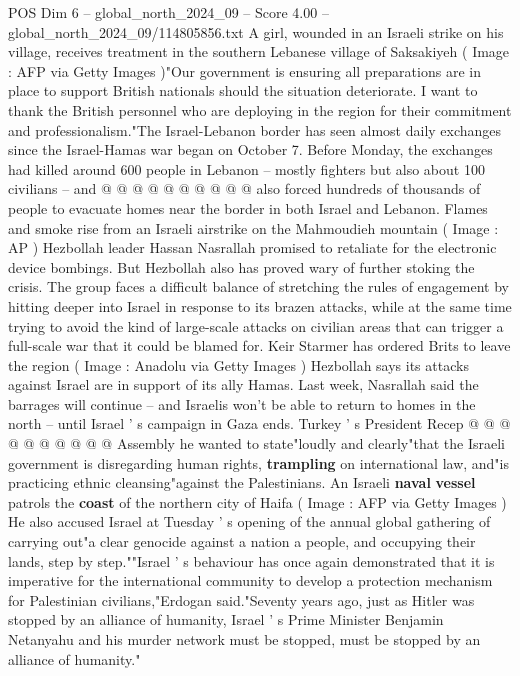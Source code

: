 \begin{textsample}{POS Dim 6 – global\_north\_2024\_09 – Score 4.00 – global\_north\_2024\_09/114805856.txt}
A girl, wounded in an Israeli strike on his village, receives treatment in the southern Lebanese village of Saksakiyeh ( Image : AFP via Getty Images )"Our government is ensuring all preparations are in place to support British nationals should the situation deteriorate.
I want to thank the British personnel who are deploying in the region for their commitment and professionalism."The Israel-Lebanon border has seen almost daily exchanges since the Israel-Hamas war began on October 7.
Before Monday, the exchanges had killed around 600 people in Lebanon -- mostly fighters but also about 100 civilians -- and @ @ @ @ @ @ @ @ @ @ also forced hundreds of thousands of people to evacuate homes near the border in both Israel and Lebanon.
Flames and smoke rise from an Israeli airstrike on the Mahmoudieh mountain ( Image : AP ) Hezbollah leader Hassan Nasrallah promised to retaliate for the electronic device bombings.
But Hezbollah also has proved wary of further stoking the crisis.
The group faces a difficult balance of stretching the rules of engagement by hitting deeper into Israel in response to its brazen attacks, while at the same time trying to avoid the kind of large-scale attacks on civilian areas that can trigger a full-scale war that it could be blamed for.
Keir Starmer has ordered Brits to leave the region ( Image : Anadolu via Getty Images ) Hezbollah says its attacks against Israel are in support of its ally Hamas.
Last week, Nasrallah said the barrages will continue -- and Israelis won't be able to return to homes in the north -- until Israel ' s campaign in Gaza ends.
Turkey ' s President Recep @ @ @ @ @ @ @ @ @ @ Assembly he wanted to state"loudly and clearly"that the Israeli government is disregarding human rights, \textbf{trampling} on international law, and"is practicing ethnic cleansing"against the Palestinians.
An Israeli \textbf{naval} \textbf{vessel} patrols the \textbf{coast} of the northern city of Haifa ( Image : AFP via Getty Images ) He also accused Israel at Tuesday ' s opening of the annual global gathering of carrying out"a clear genocide against a nation a people, and occupying their lands, step by step.""Israel ' s behaviour has once again demonstrated that it is imperative for the international community to develop a protection mechanism for Palestinian civilians,"Erdogan said."Seventy years ago, just as Hitler was stopped by an alliance of humanity, Israel ' s Prime Minister Benjamin Netanyahu and his murder network must be stopped, must be stopped by an alliance of humanity."

\end{textsample}
